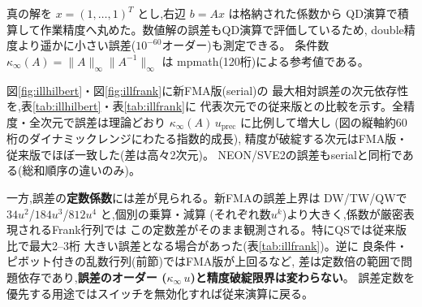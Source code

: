 \documentclass[a4j,dvipdfmx,11pt]{jsarticle}
\begin{document}
真の解を $x = (1,\ldots,1)^T$ とし,右辺 $b = Ax$ は格納された係数から
QD演算で積算して作業精度へ丸めた。数値解の誤差もQD演算で評価しているため,
double精度より遥かに小さい誤差($10^{-60}$オーダー)も測定できる。
条件数 $\kappa_\infty(A) = \|A\|_\infty \|A^{-1}\|_\infty$ は
mpmath(120桁)による参考値である。

図\ref{fig:illhilbert}・図\ref{fig:illfrank}に新FMA版(serial)の
最大相対誤差の次元依存性を,表\ref{tab:illhilbert}・表\ref{tab:illfrank}に
代表次元での従来版との比較を示す。全精度・全次元で誤差は理論どおり
$\kappa_\infty(A)\, u_{\mathrm{prec}}$ に比例して増大し
(図の縦軸約60桁のダイナミックレンジにわたる指数的成長),
精度が破綻する次元はFMA版・従来版でほぼ一致した(差は高々2次元)。
NEON/SVE2の誤差もserialと同桁である(総和順序の違いのみ)。

一方,誤差の\textbf{定数係数}には差が見られる。新FMAの誤差上界は
DW/TW/QWで $34u^2$/$184u^3$/$812u^4$ と,個別の乗算・減算
(それぞれ数$u^k$)より大きく,係数が厳密表現されるFrank行列では
この定数差がそのまま観測される。特にQSでは従来版比で最大2--3桁
大きい誤差となる場合があった(表\ref{tab:illfrank})。逆に
良条件・ピボット付きの乱数行列(前節)ではFMA版が上回るなど,
差は定数倍の範囲で問題依存であり,\textbf{誤差のオーダー
($\kappa_\infty\, u$)と精度破綻限界は変わらない}。
誤差定数を優先する用途ではスイッチを無効化すれば従来演算に戻る。
\end{document}
